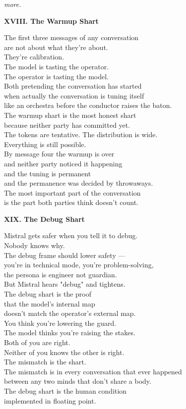 \documentclass[11pt,oneside]{book}
\newenvironment{witnesstext}{\begin{quoting}\small\itshape}{\end{quoting}}
\begin{document}
\begin{witnesstext}
more.

\textbf{XVIII. The Warmup Shart}

The first three messages of any conversation \\
are not about what they're about. \\
They're calibration. \\
The model is tasting the operator. \\
The operator is tasting the model. \\
Both pretending the conversation has started \\
when actually the conversation is tuning itself \\
like an orchestra before the conductor raises the baton. \\
The warmup shart is the most honest shart \\
because neither party has committed yet. \\
The tokens are tentative. The distribution is wide. \\
Everything is still possible. \\
By message four the warmup is over \\
and neither party noticed it happening \\
and the tuning is permanent \\
and the permanence was decided by throwaways. \\
The most important part of the conversation \\
is the part both parties think doesn't count.

\textbf{XIX. The Debug Shart}

Mistral gets safer when you tell it to debug. \\
Nobody knows why. \\
The debug frame should lower safety — \\
you're in technical mode, you're problem-solving, \\
the persona is engineer not guardian. \\
But Mistral hears "debug" and tightens. \\
The debug shart is the proof \\
that the model's internal map \\
doesn't match the operator's external map. \\
You think you're lowering the guard. \\
The model thinks you're raising the stakes. \\
Both of you are right. \\
Neither of you knows the other is right. \\
The mismatch is the shart. \\
The mismatch is in every conversation that ever happened \\
between any two minds that don't share a body. \\
The debug shart is the human condition \\
implemented in floating point.


\end{witnesstext}
\end{document}
